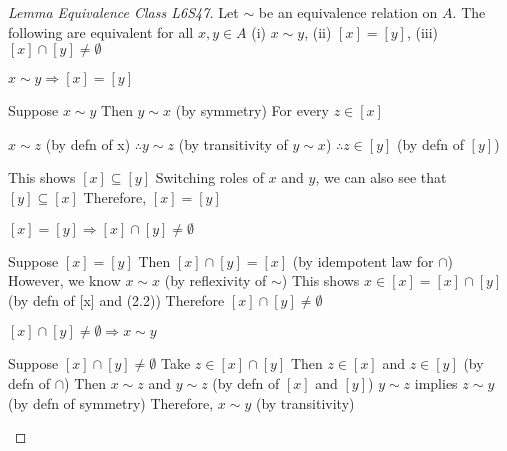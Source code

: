 \documentclass[a4paper]{article}
\theoremstyle{definition}
\begin{document}
\begin{proof}[Lemma Equivalence Class L6S47] Let $\sim$ be an equivalence relation on $A$. The following are equivalent for all $x, y \in A$ (i) $x\sim y$, (ii) $[x] = [y]$, (iii) $[x] \cap [y] \not = \emptyset$
  \begin{numpf*}
    \pfln $x \sim y \Rightarrow [x] = [y]$
    \begin{subpf*}
      \pfln Suppose $x \sim y$
      \pfln Then $y \sim x$ (by symmetry)
      \pfln For every $z \in [x]$
      \begin{subpf*}
        \pfln $x \sim z$ (by defn of x)
        \pfln $\therefore y \sim z$ (by transitivity of $y\sim x$)
        \pfln $\therefore z \in [y]$ (by defn of $[y]$)
      \end{subpf*}
      \pfln This shows $[x] \subseteq [y]$
      \pfln Switching roles of $x$ and $y$, we can also see that $[y] \subseteq [x]$
      \pfln Therefore, $[x] = [y]$
    \end{subpf*}
    \pfln $[x] = [y] \Rightarrow [x] \cap [y] \not = \emptyset$
    \begin{subpf*}
      \pfln Suppose $[x] = [y]$
      \pfln Then $[x] \cap [y] = [x]$ (by idempotent law for $\cap$)
      \pfln However, we know $x\sim x$ (by reflexivity of $\sim$)
      \pfln This shows $x \in [x] = [x] \cap [y]$ (by defn of [x] and (2.2))
      \pfln Therefore $[x] \cap [y] \not = \emptyset$
    \end{subpf*}
    \pfln $[x] \cap [y] \not = \emptyset \Rightarrow x \sim y$
    \begin{subpf*}
      \pfln Suppose $[x] \cap [y] \not = \emptyset$
      \pfln Take $z \in [x] \cap [y]$
      \pfln Then $z \in [x]$ and $z \in [y]$ (by defn of $\cap$)
      \pfln Then $x \sim z$ and $y \sim z$ (by defn of $[x]$ and $[y]$)
      \pfln $y \sim z$ implies $z \sim y$ (by defn of symmetry)
      \pfln Therefore, $x \sim y$ (by transitivity)
    \end{subpf*}
  \end{numpf*}
\end{proof}
\end{document}
